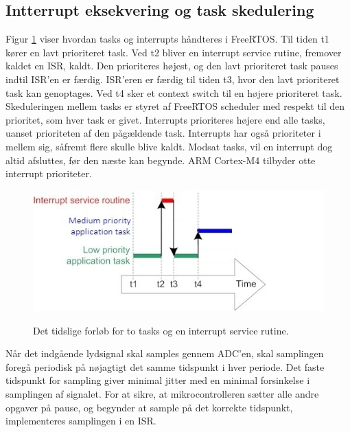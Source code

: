 \subsection{Intterrupt eksekvering og task skedulering}
\label{subsec:int_task}
Figur \ref{fig:int_task} viser hvordan tasks og interrupts håndteres i FreeRTOS. 
Til tiden t1 kører en lavt prioriteret task. 
Ved t2 bliver en interrupt service rutine, fremover kaldet en ISR, kaldt. 
Den prioriteres højest, og den lavt prioriteret task pauses indtil ISR'en er færdig.
ISR'eren er færdig til tiden t3, hvor den lavt prioriteret task kan genoptages.
Ved t4 sker et context switch til en højere prioriteret task.
Skeduleringen mellem tasks er styret af FreeRTOS scheduler med respekt til den prioritet, som hver task er givet. 
Interrupts prioriteres højere end alle tasks, uanset prioriteten af den pågældende task. 
Interrupts har også prioriteter i mellem sig, såfremt flere skulle blive kaldt. 
Modsat tasks, vil en interrupt dog altid afsluttes, før den næste kan begynde. 
ARM Cortex-M4 tilbyder otte interrupt prioriteter. 
\begin{figure}[h]
	\caption{Det tidslige forløb for to tasks og en interrupt service rutine. }
	\centering
	\includegraphics[width=0.6\linewidth]{billeder/interruptandtaskprocessing.jpg}
	\label{fig:int_task}
\end{figure}

Når det indgående lydsignal skal samples gennem ADC'en, skal samplingen foregå periodisk på nøjagtigt det samme tidspunkt i hver periode.
Det faste tidspunkt for sampling giver minimal jitter med en minimal forsinkelse i samplingen af signalet. 
For at sikre, at mikrocontrolleren sætter alle andre opgaver på pause, og begynder at sample på det korrekte tidspunkt, implementeres samplingen i en ISR.

